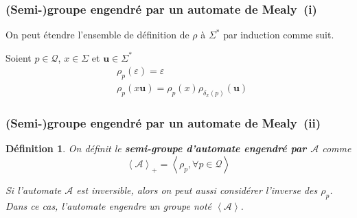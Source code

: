 \documentclass[11pt]{beamer}
\newtheorem{defi}{Définition}
\begin{document}
\begin{frame}
  \frametitle{(Semi-)groupe engendré par un automate de Mealy~(i)}

  On peut étendre l'ensemble de définition de $\rho$ à $\Sigma^*$ par induction comme suit.

  Soient $p\in\mathcal{Q}$, $x\in\Sigma$ et $\textbf{u}\in\Sigma^*$
  \begin{align*}
    &\rho_p(\varepsilon)=\varepsilon \\
    &\rho_p(x\textbf{u})=\rho_p(x)\rho_{\delta_x(p)}(\textbf{u})
  \end{align*}


  \begin{figure}[!ht]
    \begin{center}
    \end{center}
  \end{figure}
\end{frame}

\begin{frame}
  \frametitle{(Semi-)groupe engendré par un automate de Mealy~(ii)}

  \begin{defi}
    On définit le \textbf{semi-groupe d'automate engendré par $\mathcal{A}$} comme
    \begin{equation*}
      \left<\mathcal{A}\right>_+=\left<\rho_p, \forall p\in\mathcal{Q}\right>
    \end{equation*}

    Si l'automate $\mathcal{A}$ est inversible, alors on peut aussi considérer l'inverse des $\rho_p$. Dans ce cas, l'automate engendre un groupe noté $\left<\mathcal{A}\right>$.

  \end{defi}
\end{frame}
\end{document}
